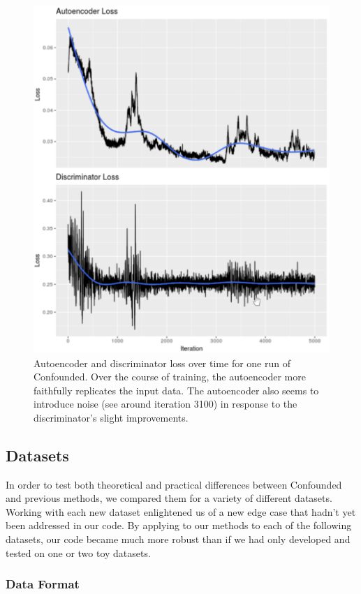 \documentclass[notitlepage]{article}
\begin{document}
\begin{figure}
	\centering
	\includegraphics[width=4.5in]{figures/rough/training_loss}
	\caption{Autoencoder and discriminator loss over time for one run of Confounded.
	Over the course of training, the autoencoder more faithfully replicates the input data.
	The autoencoder also seems to introduce noise (see around iteration 3100) in response to the discriminator's slight improvements.}
	\label{fig:training_loss}
\end{figure}

\subsection{Datasets}

In order to test both theoretical and practical differences between Confounded and previous methods, we compared them for a variety of different datasets.
Working with each new dataset enlightened us of a new edge case that hadn't yet been addressed in our code.
By applying to our methods to each of the following datasets, our code became much more robust than if we had only developed and tested on one or two toy datasets.

\subsubsection{Data Format}
\end{document}
